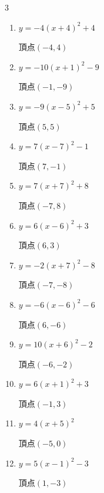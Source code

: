\begin{multicols}{3}
\begin{enumerate}
  \item $\displaystyle y=-4\left( x+4\right)^{2}+4$

        $\displaystyle 頂点\left( -4 , 4 \right)$

  \item $\displaystyle y=-10\left( x+1\right)^{2}-9$

        $\displaystyle 頂点\left( -1 , -9 \right)$

  \item $\displaystyle y=-9\left( x-5\right)^{2}+5$

        $\displaystyle 頂点\left( 5 , 5 \right)$

  \item $\displaystyle y=7\left( x-7\right)^{2}-1$

        $\displaystyle 頂点\left( 7 , -1 \right)$

  \item $\displaystyle y=7\left( x+7\right)^{2}+8$

        $\displaystyle 頂点\left( -7 , 8 \right)$

  \item $\displaystyle y=6\left( x-6\right)^{2}+3$

        $\displaystyle 頂点\left( 6 , 3 \right)$

  \item $\displaystyle y=-2\left( x+7\right)^{2}-8$

        $\displaystyle 頂点\left( -7 , -8 \right)$

  \item $\displaystyle y=-6\left( x-6\right)^{2}-6$

        $\displaystyle 頂点\left( 6 , -6 \right)$

  \item $\displaystyle y=10\left( x+6\right)^{2}-2$

        $\displaystyle 頂点\left( -6 , -2 \right)$

  \item $\displaystyle y=6\left( x+1\right)^{2}+3$

        $\displaystyle 頂点\left( -1 , 3 \right)$

  \item $\displaystyle y=4\left( x+5\right)^{2}$

        $\displaystyle 頂点\left( -5 , 0 \right)$

  \item $\displaystyle y=5\left( x-1\right)^{2}-3$

        $\displaystyle 頂点\left( 1 , -3 \right)$


\end{enumerate}
\end{multicols}
